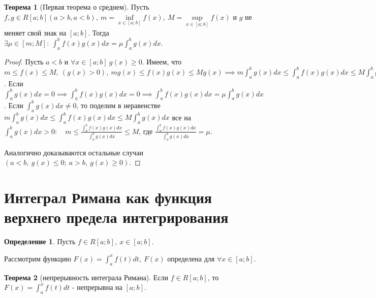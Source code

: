 \documentclass{report}
\theoremstyle{definition}
\newtheorem{definition}{Определение}[section]
\newtheorem{theorem}{Теорема}[section]
\begin{document}
\begin{theorem}[Первая теорема о среднем]
  Пусть $f,g\in R[a;b] (a>b, a<b), \ m = \underset{x\in[a;b]}{\inf}f(x), \ M = \underset{x\in[a;b]}{\sup}f(x)$
  и $g$ не меняет свой знак на $[a;b]$. Тогда $\exists \mu \in [m;M]: \ \int_{a}^{b}f(x)g(x)dx = \mu \int_{a}^{b}
    g(x)dx$.
\end{theorem}

\begin{proof}
  Пусть $a<b$ и $\forall x \in [a;b] \ g(x) \geqslant 0$. Имеем, что $m\leqslant f(x) \leqslant M, \ (g(x) > 0), \
    mg(x) \leqslant f(x)g(x) \leqslant Mg(x) \implies m \int_{a}^{b}g(x)dx \leqslant \int_{a}^{b}f(x)g(x)dx
    \leqslant M\int_{a}^{b}g(x)dx$. Если $\int_{a}^{b}g(x)dx = 0 \implies \int_{a}^{b}f(x)g(x)dx = 0 \implies
    \int_{a}^{b}f(x)g(x)dx = \mu \int_{a}^{b}g(x)dx$. Если $\int_{a}^{b}g(x)dx \ne 0$, то поделим в неравенстве
  $m \int_{a}^{b}g(x)dx \leqslant \int_{a}^{b}f(x)g(x)dx \leqslant M\int_{a}^{b}g(x)dx$ все на $\int_{a}^{b}
    g(x)dx > 0: \quad m \leqslant \frac{\int_{a}^{b}f(x)g(x)dx}{\int_{a}^{b}g(x)dx} \leqslant M$, где
  $\frac{\int_{a}^{b}f(x)g(x)dx}{\int_{a}^{b}g(x)dx} = \mu$.

  Аналогично доказываются остальные случаи $(a<b, \ g(x) \leqslant 0; \ a>b, \ g(x)\geqslant 0)$.
\end{proof}

\section{Интеграл Римана как функция верхнего предела интегрирования}

\begin{definition}
  Пусть $f\in R[a;b], \ x \in [a;b]$.

  Рассмотрим функцию $F(x) = \int_{a}^{x}f(t)dt, \ F(x)$ определена для $\forall x \in [a;b]$.
\end{definition}

\begin{theorem}[непрерывность интеграла Римана]
  Если $f\in R[a;b]$, то $F(x) = \int_{a}^{x}f(t)dt$ - непрерывна на $[a;b]$.
\end{theorem}
\end{document}
